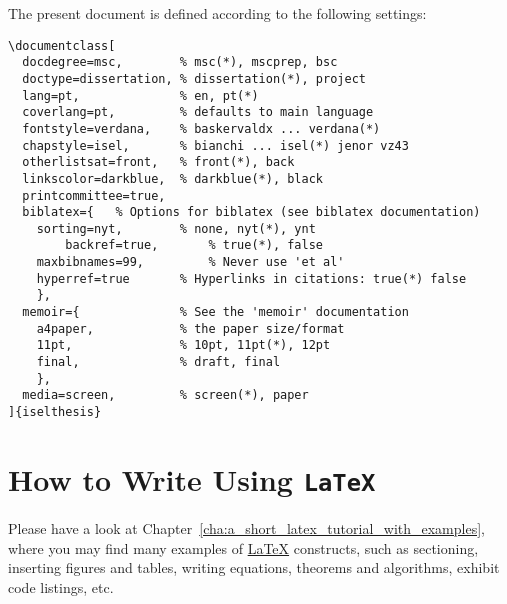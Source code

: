 The present document is defined according to the following settings:
\begin{Verbatim}[breaklines=true, breakanywhere=true]
\documentclass[
  docdegree=msc,        % msc(*), mscprep, bsc
  doctype=dissertation, % dissertation(*), project
  lang=pt,              % en, pt(*)
  coverlang=pt,         % defaults to main language
  fontstyle=verdana,    % baskervaldx ... verdana(*) 
  chapstyle=isel,       % bianchi ... isel(*) jenor vz43
  otherlistsat=front,   % front(*), back
  linkscolor=darkblue,  % darkblue(*), black 
  printcommittee=true,  
  biblatex={   % Options for biblatex (see biblatex documentation)
	sorting=nyt,        % none, nyt(*), ynt
        backref=true,       % true(*), false
    maxbibnames=99,			% Never use 'et al' 
    hyperref=true       % Hyperlinks in citations: true(*) false
	},
  memoir={	            % See the 'memoir' documentation
    a4paper,            % the paper size/format
    11pt,               % 10pt, 11pt(*), 12pt
    final,              % draft, final  
    },
  media=screen,         % screen(*), paper
]{iselthesis}
\end{Verbatim}

	
\section{How to Write Using \texttt{LaTeX}} %
\label{sec:how_to_write_using_latex}

Please have a look at Chapter~\ref{cha:a_short_latex_tutorial_with_examples}, where you may find many examples of \href{http://tobi.oetiker.ch/lshort/lshort.pdf}{\LaTeX} constructs, such as sectioning, inserting figures and tables, writing equations, theorems and algorithms, exhibit code listings, etc.

